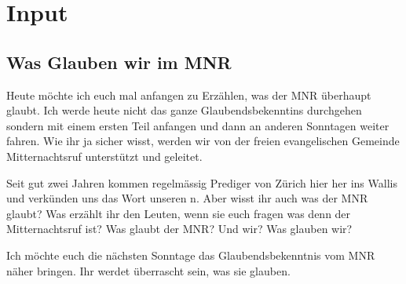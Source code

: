 \section{ Input }
\begin{spacing}{1.5}
\subsection{Was Glauben wir im MNR}
Heute möchte ich euch mal anfangen zu Erzählen, was der MNR überhaupt glaubt. Ich werde heute nicht das ganze Glaubendsbekenntins durchgehen sondern mit einem ersten Teil anfangen und dann an anderen Sonntagen weiter fahren. Wie ihr ja sicher wisst, werden wir von der freien evangelischen Gemeinde Mitternachtsruf unterstützt und geleitet.

Seit gut zwei Jahren kommen regelmässig Prediger von Zürich hier her ins Wallis und verkünden uns das Wort unseren \herr n. Aber wisst ihr auch was der MNR glaubt? Was erzählt ihr den Leuten, wenn sie euch fragen was denn der Mitternachtsruf ist? Was glaubt der MNR? Und wir? Was glauben wir?

Ich möchte euch die nächsten Sonntage das Glaubendsbekenntnis vom MNR näher bringen. Ihr werdet überrascht sein, was sie glauben.


\end{spacing}
